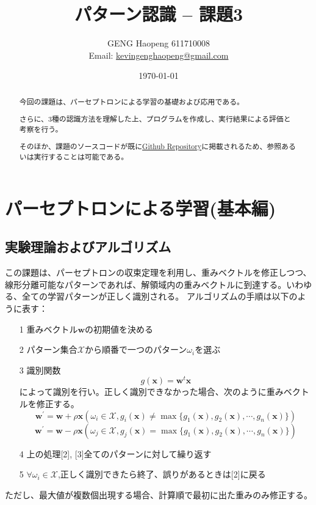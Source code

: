 \documentclass[ %
  uplatex,%
  papersize%
]{jsarticle}
\title{パターン認識 -- 課題3}
\author{\large GENG Haopeng 611710008 \\ \small Email:  \href{mailto:kevingenghaopeng@gmail.com}{kevingenghaopeng@gmail.com}}
\affil{\small Department of Intelligent Systems, Nagoya University}
\date{\today}
\begin{document}
\maketitle

\begin{abstract}
今回の課題は、パーセプトロンによる学習の基礎および応用である。

さらに、3種の認識方法を理解した上、プログラムを作成し、実行結果による評価と考察を行う。

そのほか、課題のソースコードが既に\href{https://github.com/Secondtonumb/pattern_recogn/tree/master/pattern03}{Github Repository}に掲載されるため、参照あるいは実行することは可能である。
\end{abstract}


\section{パーセプトロンによる学習(基本編)}
\subsection{実験理論およびアルゴリズム}
この課題は、パーセプトロンの収束定理を利用し、重みベクトルを修正しつつ、線形分離可能なパターンであれば、解領域内の重みベクトルに到達する。いわゆる、全ての学習パターンが正しく識別される。
アルゴリズムの手順は以下のように表す：
\begin{itemize}
\small
\item[1] 重みベクトル$\bm{w}$の初期値を決める
\item[2] パターン集合$\mathcal{X}$から順番で一つのパターン$\omega_{i}$を選ぶ
\item[3] 識別関数
	$$g(\bm{x})=\bm{w}^{t}\bm{x}$$
	によって識別を行い。正しく識別できなかった場合、次のように重みベクトルを修正する。
	$$\bm{w}^{'}= \bm{w} +\rho\bm{x}    (\omega_{i}\in\mathcal{X},g_{i}(\bm{x})\neq \max\{g_{1}(\bm{x}),g_{2}(\bm{x}),\cdots,g_{n}(\bm{x}) \})$$
	$$\bm{w}^{'}= \bm{w} -\rho\bm{x}     (\omega_{j}\in\mathcal{X},g_{j}(\bm{x})= \max\{g_{1}(\bm{x}),g_{2}(\bm{x}),\cdots,g_{n}(\bm{x}) \})$$
\item[4] 上の処理[2], [3]全てのパターンに対して繰り返す
\item[5]  $\forall \omega_{i}\in\mathcal{X}$,正しく識別できたら終了、誤りがあるときは[2]に戻る
\end{itemize}

ただし、最大値が複数個出現する場合、計算順で最初に出た重みのみ修正する。
\end{document}
